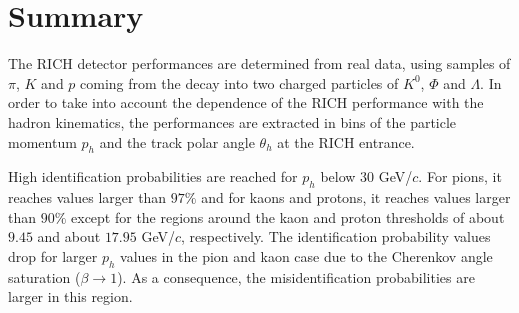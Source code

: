 
\newpage

\section{Summary}

The RICH detector performances are determined from real data, using samples of $\pi$, $K$ and $p$ coming from the decay into two charged particles of $K^0$, $\Phi$ and $\Lambda$. In order to take into account the dependence of the RICH performance with the hadron kinematics, the performances are extracted in bins of the particle momentum $p_h$ and the track polar angle $\theta_h$ at the RICH entrance.

High identification probabilities are reached for $p_h$ below $30$ GeV/$c$. For pions, it reaches values larger than $97\%$ and for kaons and protons, it reaches values larger than $90\%$ except for the regions around the kaon and proton thresholds of about $9.45$ and about $17.95$ GeV/$c$, respectively. The identification probability values drop for larger $p_h$ values in the pion and kaon case due to the Cherenkov angle saturation ($\beta \rightarrow 1$). As a consequence, the misidentification probabilities are larger in this region.
